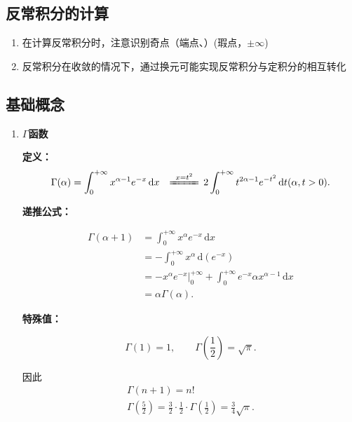\documentclass[a4paper,12pt]{article}
\begin{document}
    \subsection{反常积分的计算}

    \begin{enumerate}
        \item 在计算反常积分时，注意识别奇点（端点、{\color{red}{内部}}）(瑕点，$\pm \infty$)
        \item 反常积分在收敛的情况下，通过换元可能实现反常积分与定积分的相互转化
    \end{enumerate}

    \subsection{基础概念}

    \begin{enumerate}
        \item \textbf{$\Gamma$函数}

        \textbf{定义：}
        \[
            \begin{aligned}
                \Gamma(\alpha)
                &= \int_{0}^{+\infty} x^{\alpha-1} e^{-x}\,\mathrm{d}x
                &\xlongequal{\;x=t^2\;} \, 2\int_{0}^{+\infty} t^{2\alpha-1} e^{-t^2}\,\mathrm{d}t (\alpha, t > 0).
            \end{aligned}
        \]

        \textbf{递推公式：}

        \[
            \begin{aligned}
                \Gamma(\alpha+1)
                &= \int_{0}^{+\infty} x^{\alpha} e^{-x}\,\mathrm{d}x \\
                &= -\int_{0}^{+\infty} x^{\alpha}\,\mathrm{d}(e^{-x}) \\
                &= -x^{\alpha} e^{-x}\Big|_{0}^{+\infty}
                + \int_{0}^{+\infty} e^{-x}\alpha x^{\alpha-1}\,\mathrm{d}x \\
                &= \alpha \Gamma(\alpha).
            \end{aligned}
        \]

        \textbf{特殊值：}

        \[
            \Gamma(1)=1,
            \qquad
            \Gamma\!\left(\frac{1}{2}\right)=\sqrt{\pi}.
        \]

        因此
        \begin{gather*}
            \Gamma(n+1)=n! \\
            \Gamma\!\left(\frac{5}{2}\right)
            = \frac{3}{2}\cdot\frac{1}{2}\cdot\Gamma\!\left(\frac{1}{2}\right)
            = \frac34\sqrt{\pi}.\\
        \end{gather*}
    \end{enumerate}
\end{document}
